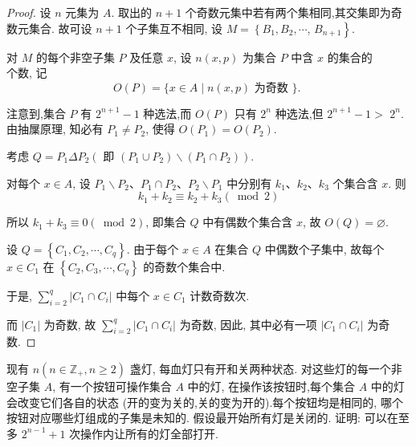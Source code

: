 \begin{proof}
	设 $n$ 元集为 $A$. 取出的 $n+1$ 个奇数元集中若有两个集相同,其交集即为奇数元集合. 故可设 $n+1$ 个子集互不相同, 设 $M=\left\{B_{1}, B_{2}, \cdots\right.$, $\left.B_{n+1}\right\}$.

	对 $M$ 的每个非空子集 $P$ 及任意 $x$, 设 $n(x, p)$ 为集合 $P$ 中含 $x$ 的集合的\\
	个数, 记
	$$
		O(P)=\{x \in A \mid n(x, p) \text { 为奇数 }\} \text {. }
	$$

	注意到,集合 $P$ 有 $2^{n+1}-1$ 种选法,而 $O(P)$ 只有 $2^{n}$ 种选法,但 $2^{n+1}-1>$ $2^{n}$. 由抽屟原理, 知必有 $P_{1} \neq P_{2}$, 使得 $O\left(P_{1}\right)=O\left(P_{2}\right)$.

	考虑 $Q=P_{1} \Delta P_{2}\left(\right.$ 即 $\left.\left(P_{1} \cup P_{2}\right) \backslash\left(P_{1} \cap P_{2}\right)\right)$.

	对每个 $x \in A$, 设 $P_{1} \backslash P_{2} 、 P_{1} \cap P_{2} 、 P_{2} \backslash P_{1}$ 中分别有 $k_{1} 、 k_{2} 、 k_{3}$ 个集合含 $x$. 则
	$$
		k_{1}+k_{2} \equiv k_{2}+k_{3}(\bmod 2)
	$$

	所以 $k_{1}+k_{3} \equiv 0(\bmod 2)$, 即集合 $Q$ 中有偶数个集合含 $x$, 故 $O(Q)=\varnothing$.

	设 $Q=\left\{C_{1}, C_{2}, \cdots, C_{q}\right\}$. 由于每个 $x \in A$ 在集合 $Q$ 中偶数个子集中, 故每个 $x \in C_{1}$ 在 $\left\{C_{2}, C_{3}, \cdots, C_{q}\right\}$ 的奇数个集合中.

	于是, $\sum_{i=2}^{q}\left|C_{1} \cap C_{i}\right|$ 中每个 $x \in C_{1}$ 计数奇数次.

	而 $\left|C_{1}\right|$ 为奇数, 故 $\sum_{i=2}^{q}\left|C_{1} \cap C_{i}\right|$ 为奇数, 因此, 其中必有一项 $\left|C_{1} \cap C_{i}\right|$ 为奇数.
\end{proof}

\begin{example}
	现有 $n\left(n \in \mathbb{Z}_{+}, n \geqslant 2\right)$ 盏灯, 每血灯只有开和关两种状态. 对这些灯的每一个非空子集 $A$, 有一个按钮可操作集合 $A$ 中的灯, 在操作该按钮时,每个集合 $A$ 中的灯会改变它们各自的状态 (开的变为关的,关的变为开的).每个按钮均是相同的, 哪个按钮对应哪些灯组成的子集是未知的. 假设最开始所有灯是关闭的. 证明: 可以在至多 $2^{n-1}+1$ 次操作内让所有的灯全部打开.
\end{example}


